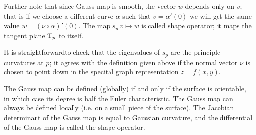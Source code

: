 Further note that since Gauss map is smooth,
the vector $w$ depends only on $v$;
that is if we choose a different curve $\alpha$ such that $v=\alpha'(0)$ we will get the same value $w=(\nu\circ\alpha)'(0)$.
The map $s_p\:v\mapsto w$ is called shape operator;
it maps the tangent plane $\mathrm{T}_p$ to itself.

It is straightforwardto check that the eigenvalues of $s_p$ are the principle curvatures at $p$; it agrees with the definition given above if the normal vector $\nu$ is chosen to point down in the specital graph representation $z=f(x,y)$.







The Gauss map can be defined (globally) if and only if the surface is orientable, in which case its degree is half the Euler characteristic. The Gauss map can always be defined locally (i.e. on a small piece of the surface). The Jacobian determinant of the Gauss map is equal to Gaussian curvature, and the differential of the Gauss map is called the shape operator. 









